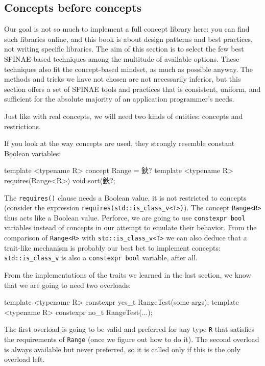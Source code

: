 \subsection{Concepts before concepts}

Our goal is not so much to implement a full concept library here: you can find such libraries online, and this book is about design patterns and best practices, not writing specific libraries. The aim of this section is to select the few best SFINAE-based techniques among the multitude of available options. These techniques also fit the concept-based mindset, as much as possible anyway. The methods and tricks we have not chosen are not necessarily inferior, but this section offers a set of SFINAE tools and practices that is consistent, uniform, and sufficient for the absolute majority of an application programmer's needs.

Just like with real concepts, we will need two kinds of entities: concepts and restrictions.

If you look at the way concepts are used, they strongly resemble constant Boolean variables:

\begin{code}
template <typename R> concept Range = 鈥?
template <typename R> requires(Range<R>) void sort(鈥?;
\end{code}

The \texttt{requires()} clause needs a Boolean value, it is not restricted to concepts (consider the expression \texttt{requires(std::is\_class\_v\textless{}T\textgreater{})}). The concept \texttt{Range\textless{}R\textgreater{}} thus acts like a Boolean value. Perforce, we are going to use \texttt{constexpr\ bool} variables instead of concepts in our attempt to emulate their behavior. From the comparison of \texttt{Range\textless{}R\textgreater{}} with \texttt{std::is\_class\_v\textless{}T\textgreater{}} we can also deduce that a trait-like mechanism is probably our best bet to implement concepts: \texttt{std::is\_class\_v} is also a \texttt{constexpr\ bool} variable, after all.

From the implementations of the traits we learned in the last section, we know that we are going to need two overloads:

\begin{code}
template <typename R> constexpr yes_t RangeTest(some-args);
template <typename R> constexpr no_t RangeTest(...);
\end{code}

The first overload is going to be valid and preferred for any type \texttt{R} that satisfies the requirements of \texttt{Range} (once we figure out how to do it). The second overload is always available but never preferred, so it is called only if this is the only overload left.


